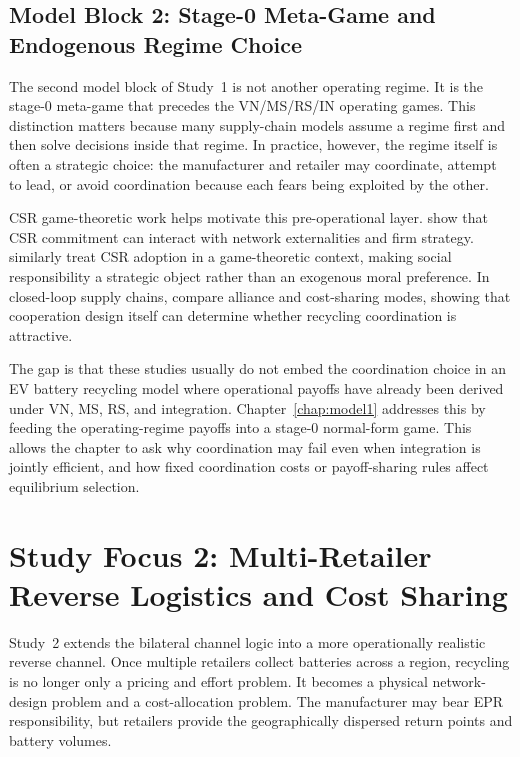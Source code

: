 \subsection{Model Block 2: Stage-0 Meta-Game and Endogenous Regime Choice}
\label{sec:lit_block2}

The second model block of Study~1 is not another operating regime. It is the stage-0 meta-game that precedes the VN/MS/RS/IN operating games. This distinction matters because many supply-chain models assume a regime first and then solve decisions inside that regime. In practice, however, the regime itself is often a strategic choice: the manufacturer and retailer may coordinate, attempt to lead, or avoid coordination because each fears being exploited by the other.

CSR game-theoretic work helps motivate this pre-operational layer. \cite{Buccella2024} show that CSR commitment can interact with network externalities and firm strategy. \cite{FantiBuccella2017} similarly treat CSR adoption in a game-theoretic context, making social responsibility a strategic object rather than an exogenous moral preference. In closed-loop supply chains, \cite{ZhengB2022} compare alliance and cost-sharing modes, showing that cooperation design itself can determine whether recycling coordination is attractive.

The gap is that these studies usually do not embed the coordination choice in an EV battery recycling model where operational payoffs have already been derived under VN, MS, RS, and integration. Chapter~\ref{chap:model1} addresses this by feeding the operating-regime payoffs into a stage-0 normal-form game. This allows the chapter to ask why coordination may fail even when integration is jointly efficient, and how fixed coordination costs or payoff-sharing rules affect equilibrium selection.

\section{Study Focus 2: Multi-Retailer Reverse Logistics and Cost Sharing}
\label{sec:lit_study2}

Study~2 extends the bilateral channel logic into a more operationally realistic reverse channel. Once multiple retailers collect batteries across a region, recycling is no longer only a pricing and effort problem. It becomes a physical network-design problem and a cost-allocation problem. The manufacturer may bear EPR responsibility, but retailers provide the geographically dispersed return points and battery volumes.

